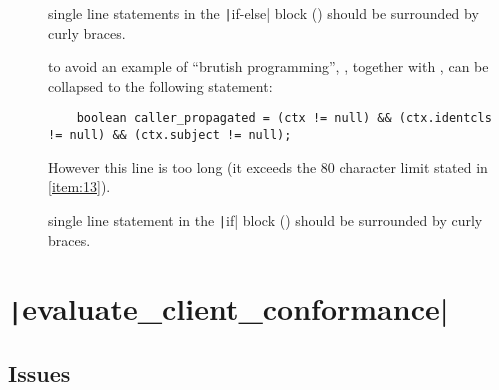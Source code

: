 
\begin{description}
	
	\item [] 
		single line statements in the \texttt|if-else| block () should be surrounded by curly braces.
		
	\item []
		to avoid an example of ``brutish programming'', , together with , can be collapsed to the following statement: 
		\begin{verbatim}
	boolean caller_propagated = (ctx != null) && (ctx.identcls != null) && (ctx.subject != null);
		\end{verbatim}
		However this line is too long (it exceeds the 80 character limit stated in \cref{item:13}).

\end{description}


\begin{description}
		
	\item [] 
		single line statement in the \texttt|if| block () should be surrounded by curly braces.

\end{description}

	






\section{\normalfont\texttt|evaluate_client_conformance|}


\subsection{Issues}


